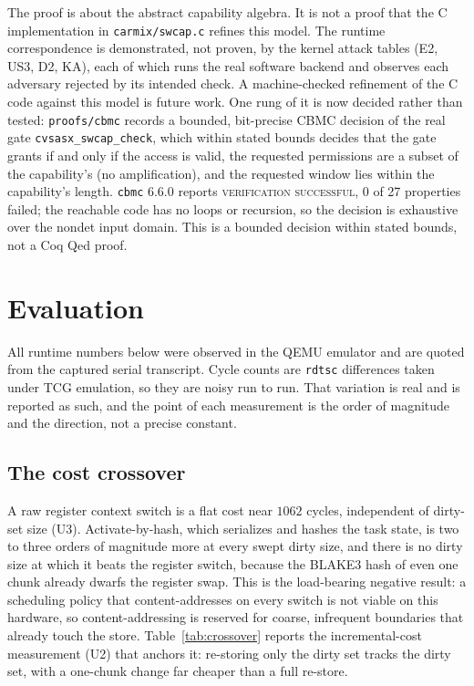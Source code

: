 \documentclass[10pt,twocolumn]{article}
\begin{document}
The proof is about the abstract capability algebra. It is not a proof that the C
implementation in \texttt{carmix/swcap.c} refines this model. The runtime
correspondence is demonstrated, not proven, by the kernel attack tables (E2, US3,
D2, KA), each of which runs the real software backend and observes each adversary
rejected by its intended check. A machine-checked refinement of the C code against
this model is future work. One rung of it is now decided rather than tested:
\texttt{proofs/cbmc} records a bounded, bit-precise CBMC decision of the real gate
\texttt{cvsasx\_swcap\_check}, which within stated bounds decides that the gate
grants if and only if the access is valid, the requested permissions are a subset
of the capability's (no amplification), and the requested window lies within the
capability's length. \texttt{cbmc} 6.6.0 reports \textsc{verification successful},
0 of 27 properties failed; the reachable code has no loops or recursion, so the
decision is exhaustive over the nondet input domain. This is a bounded decision
within stated bounds, not a Coq Qed proof.

\section{Evaluation}

All runtime numbers below were observed in the QEMU emulator and are quoted from
the captured serial transcript. Cycle counts are \texttt{rdtsc} differences taken
under TCG emulation, so they are noisy run to run. That variation is real and is
reported as such, and the point of each measurement is the order of magnitude and
the direction, not a precise constant.

\subsection{The cost crossover}

A raw register context switch is a flat cost near $1062$ cycles, independent of
dirty-set size (U3). Activate-by-hash, which serializes and hashes the task state,
is two to three orders of magnitude more at every swept dirty size, and there is
no dirty size at which it beats the register switch, because the BLAKE3 hash of
even one chunk already dwarfs the register swap. This is the load-bearing negative
result: a scheduling policy that content-addresses on every switch is not viable
on this hardware, so content-addressing is reserved for coarse, infrequent
boundaries that already touch the store. Table~\ref{tab:crossover} reports the
incremental-cost measurement (U2) that anchors it: re-storing only the dirty set
tracks the dirty set, with a one-chunk change far cheaper than a full re-store.
\end{document}
